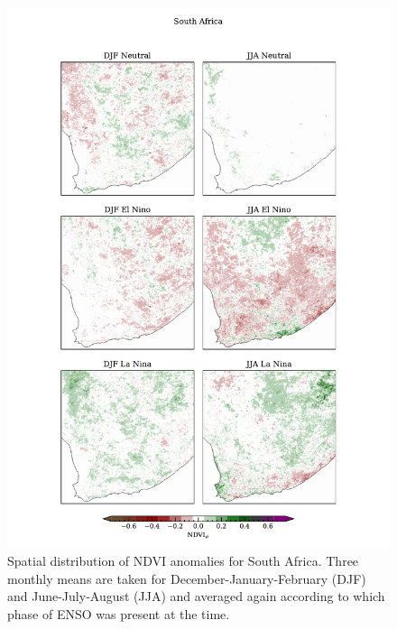 \begin{figure}
  \centering
  \includegraphics[height=0.9\textheight]{figures/ndvi_spatial_seasonal_anomalies_capetown}
  \caption{Spatial distribution of NDVI anomalies for South
    Africa. Three monthly means are taken for
    December-January-February (DJF) and June-July-August (JJA) and
    averaged again according to which phase of ENSO was present at the
    time.}
  \label{fig:ndvi_sp_south}
\end{figure}

